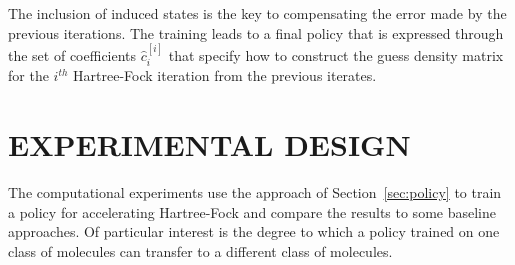 \documentclass[twoside,11pt]{article}
\begin{document}
The inclusion of induced states is the key to compensating the error made by the previous iterations. The training leads to a final policy that is expressed through the set of coefficients $\hat{c}^{[i]}_i$ that specify how to construct the guess density matrix for the $i^{th}$ Hartree-Fock iteration from the previous iterates.

\section{EXPERIMENTAL DESIGN}\label{sec:exp}
The computational experiments use the approach of Section~\ref{sec:policy} to train a policy for accelerating Hartree-Fock and compare the results to some baseline approaches. Of particular interest is the degree to which a policy trained on one class of molecules can transfer to a different class of molecules.
\end{document}
